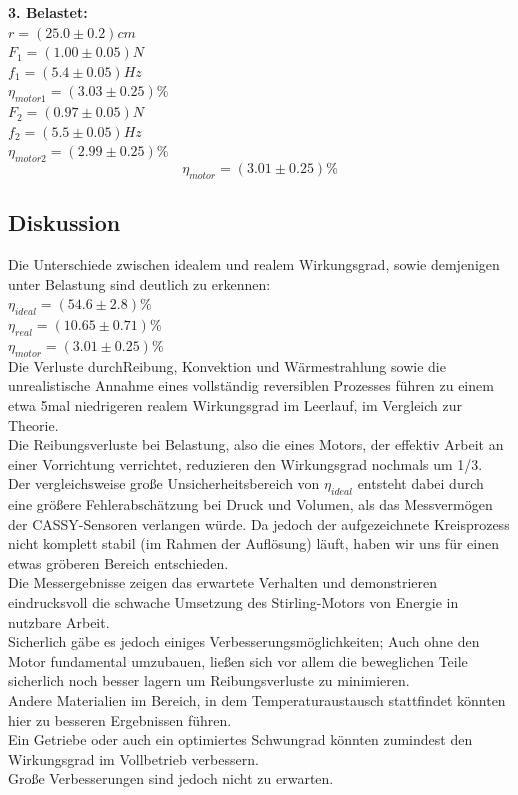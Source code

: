 \documentclass[12pt,a4paper]{article}
\begin{document}
\begin{multicols}{2}
\noindent \textbf{3. Belastet:}\\
$r = (25.0 \pm 0.2)cm$\\
$F_1 = (1.00 \pm 0.05)N$\\
$f_1 = (5.4 \pm 0.05)Hz$\\
$\eta_{motor1}=(3.03\pm 0.25)\%$\\
$F_2=(0.97\pm 0.05)N$\\
$f_2 = (5.5 \pm 0.05)Hz$\\
$\eta_{motor2}=(2.99\pm 0.25)\%$\\
$$\eta_{motor}=(3.01\pm 0.25)\%$$


\subsection{Diskussion}

Die Unterschiede zwischen idealem und realem Wirkungsgrad, sowie demjenigen unter Belastung sind deutlich zu erkennen:\\
$\eta_{ideal}=(54.6 \pm 2.8)\%$\\
$\eta_{real}=(10.65 \pm 0.71)\%$\\
$\eta_{motor}=(3.01\pm 0.25)\%$\\

\noindent Die Verluste durchReibung, Konvektion und Wärmestrahlung sowie die unrealistische Annahme eines vollständig reversiblen Prozesses führen zu einem etwa 5mal niedrigeren realem Wirkungsgrad im Leerlauf, im Vergleich zur Theorie.\\
Die Reibungsverluste bei Belastung, also die eines Motors, der effektiv Arbeit an einer Vorrichtung verrichtet, reduzieren den Wirkungsgrad nochmals um 1/3.\\

\noindent Der vergleichsweise große Unsicherheitsbereich von $\eta_{ideal}$ entsteht dabei durch eine größere Fehlerabschätzung bei Druck und Volumen, als das Messvermögen der CASSY-Sensoren verlangen würde. Da jedoch der aufgezeichnete Kreisprozess nicht komplett stabil (im Rahmen der Auflösung) läuft, haben wir uns für einen etwas gröberen Bereich entschieden.\\

\noindent Die Messergebnisse zeigen das erwartete Verhalten und demonstrieren eindrucksvoll die schwache Umsetzung des Stirling-Motors von Energie in nutzbare Arbeit.\\
Sicherlich gäbe es jedoch einiges Verbesserungsmöglichkeiten; Auch ohne den Motor fundamental umzubauen, ließen sich vor allem die beweglichen Teile sicherlich noch besser lagern um Reibungsverluste zu minimieren.\\
Andere Materialien im Bereich, in dem Temperaturaustausch stattfindet könnten hier zu besseren Ergebnissen führen.\\
Ein Getriebe oder auch ein optimiertes Schwungrad könnten zumindest den Wirkungsgrad im Vollbetrieb verbessern.\\
Große Verbesserungen sind jedoch nicht zu erwarten.\\


\end{multicols}
\end{document}
